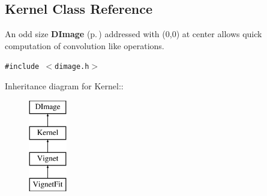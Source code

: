 \subsection{Kernel  Class Reference}
\label{class_kernel}
An odd size {\bf DImage} {\rm (p.\,\pageref{class_dimage})} addressed with (0,0) at center allows quick computation of convolution like operations. 


{\tt \#include $<$dimage.h$>$}

Inheritance diagram for Kernel::\begin{figure}[H]
\begin{center}
\leavevmode
\includegraphics[height=4cm]{class_kernel}
\end{center}
\end{figure}
